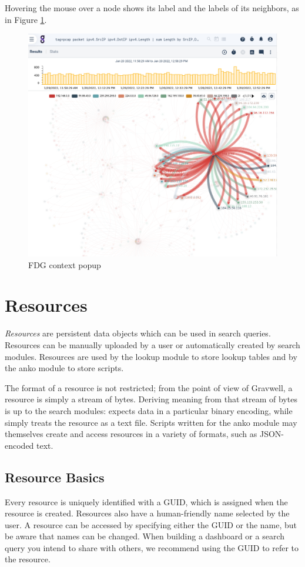 Hovering the mouse over a node shows its label and the labels of its
neighbors, as in Figure \ref{fig:fdg-context}.

\begin{figure}
	\includegraphics[width=0.6\linewidth]{images/fdg-context.png}
	\caption{FDG context popup}
	\label{fig:fdg-context}
\end{figure}

\clearpage

\section{Resources}
\label{sec:resources}
\emph{Resources} are persistent data objects which can be used in search
queries. Resources can be manually uploaded by a user or automatically
created by search modules. Resources are used by the lookup module to
store lookup tables and by the anko module to store scripts.

The format of a resource is not restricted; from the point of view of
Gravwell, a resource is simply a stream of bytes. Deriving meaning from
that stream of bytes is up to the search modules:  expects data in
a particular binary encoding, while  simply treats the resource as a
text file. Scripts written for the anko module may themselves create and
access resources in a variety of formats, such as JSON-encoded text.

\subsection{Resource Basics}

Every resource is uniquely identified with a GUID, which is assigned
when the resource is created. Resources also have a human-friendly name
selected by the user. A resource can be accessed by specifying either
the GUID or the name, but be aware that names can be changed. When
building a dashboard or a search query you intend to share with others,
we recommend using the GUID to refer to the resource.

